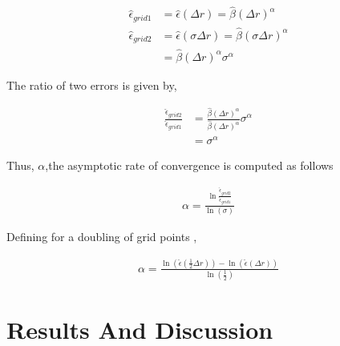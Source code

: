 \documentclass[12pt]{article}
\begin{document}
\begin{align*}
    \hat{\epsilon}_{grid 1} &= \hat{\epsilon}(\Delta r) = \hat{\beta}(\Delta r)^{\alpha} \\
    \hat{\epsilon}_{grid 2} &= \hat{\epsilon}(\sigma \Delta r) = \hat{\beta}(\sigma \Delta r)^{\alpha} \\
                            &= \hat{\beta}(\Delta r)^{\alpha} \sigma^{\alpha}
\end{align*}

The ratio of two errors is given by,

\begin{align*}
    \frac{\hat{\epsilon}_{grid 2}}{\hat{\epsilon}_{grid 1}} &= 
    \frac{\hat{\beta}(\Delta r )^{\alpha}}{\hat{\beta}(\Delta r )^{\alpha}} \sigma^{\alpha} \\ &= \sigma^{\alpha}
\end{align*}

Thus, $\alpha$,the asymptotic rate of convergence is computed as follows 

\begin{align*}
    \alpha = \frac{
        \ln \frac{
            \hat{\epsilon}_{grid 2}
    }{\hat{\epsilon}_{grid 1} }}
    {\ln\left( \sigma \right) }
\end{align*}

Defining  for a doubling of grid points ,

\begin{align*}
    \alpha = \frac{\ln \left( \hat{\epsilon}\left( \frac{1}{2}\Delta  r\right)
            \right) -\ln \left( \hat{\epsilon}\left( \Delta  r\right)
    \right)}{\ln \left( \frac{1}{2} \right)}
\end{align*}

\section{Results And Discussion}
% 
\begin{figure}
    \begin{center}
       
    \end{center}
\end{figure}


\begin{figure}
    \begin{center}
        
    \end{center}
\end{figure}
\end{document}
